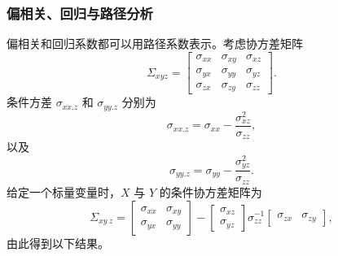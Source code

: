 \subsubsection{偏相关、回归与路径分析}

偏相关和回归系数都可以用路径系数表示。考虑协方差矩阵
\[
\Sigma_{xyz}=
\begin{bmatrix}
\sigma_{xx}&\sigma_{xy}&\sigma_{xz}\\
\sigma_{yx}&\sigma_{yy}&\sigma_{yz}\\
\sigma_{zx}&\sigma_{zy}&\sigma_{zz}
\end{bmatrix}.
\]
条件方差 $\sigma_{xx.z}$ 和 $\sigma_{yy.z}$ 分别为
\begin{equation}
\sigma_{xx.z}=\sigma_{xx}-\frac{\sigma_{xz}^2}{\sigma_{zz}},
\tag{1.129}
\end{equation}
以及
\begin{equation}
\sigma_{yy.z}=\sigma_{yy}-\frac{\sigma_{yz}^2}{\sigma_{zz}}.
\tag{1.130}
\end{equation}
给定一个标量变量时，$X$ 与 $Y$ 的条件协方差矩阵为
\begin{equation}
\Sigma_{xy\ z}=
\begin{bmatrix}\sigma_{xx}&\sigma_{xy}\\\sigma_{yx}&\sigma_{yy}\end{bmatrix}
-\begin{bmatrix}\sigma_{xz}\\\sigma_{yz}\end{bmatrix}
\sigma_{zz}^{-1}
\begin{bmatrix}\sigma_{zx}&\sigma_{zy}\end{bmatrix},
\tag{1.131}
\end{equation}
由此得到以下结果。

